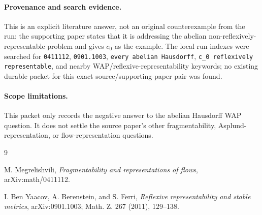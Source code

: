 \documentclass[11pt]{article}
\begin{document}
\paragraph{Provenance and search evidence.}
This is an explicit literature answer, not an original counterexample from the
run: the supporting paper states that it is addressing the abelian
non-reflexively-representable problem and gives \(c_0\) as the example. The
local run indexes were searched for \texttt{0411112}, \texttt{0901.1003},
\texttt{every abelian Hausdorff}, \texttt{c\_0 reflexively representable}, and
nearby WAP/reflexive-representability keywords; no existing durable packet for
this exact source/supporting-paper pair was found.

\paragraph{Scope limitations.}
This packet only records the negative answer to the abelian Hausdorff WAP
question. It does not settle the source paper's other fragmentability,
Asplund-representation, or flow-representation questions.

\begin{thebibliography}{9}

M. Megrelishvili,
\emph{Fragmentability and representations of flows},
arXiv:math/0411112.

I. Ben Yaacov, A. Berenstein, and S. Ferri,
\emph{Reflexive representability and stable metrics},
arXiv:0901.1003; Math. Z. 267 (2011), 129--138.

\end{thebibliography}
\end{document}
